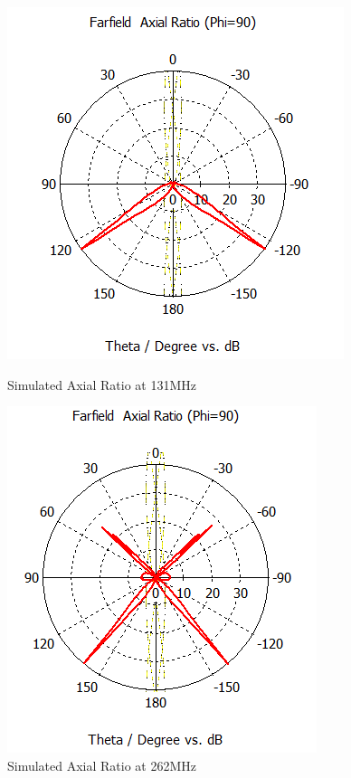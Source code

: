 \begin{figure}[H]
  \centering
  \begin{minipage}[b]{0.5\textwidth}
	\includegraphics[scale = 0.6]{figures/antennas/qha/qha_6_ff_131_AR}
	\caption{Simulated Axial Ratio at 131MHz}	
    \label{fig:QHA_ff_131_AR}
  \end{minipage}
  \hfill
  \begin{minipage}[b]{0.4 \textwidth}
	\includegraphics[scale = 0.6]{figures/antennas/qha/qha_6_ff_262_AR}
	\caption{Simulated Axial Ratio at 262MHz}
    \label{fig:QHA_ff_262_AR}
  \end{minipage}
\end{figure}



